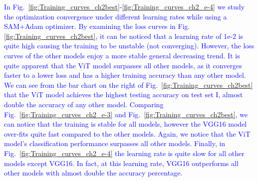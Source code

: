 \documentclass[a4paper,11pt]{article}
\begin{document}
\textcolor{blue}{In Fig.~\ref{fig:Training_curves_ch2best}-\ref{fig:Training_curves_ch2_e-4} we study the optimization convergence under different learning rates while using a SAM+Adam optimizer. By examining the loss curves in Fig.\ref{fig:Training_curves_ch2best}, it can be noticed that a learning rate of 1e-2 is quite high causing the training to be unstable (not converging). However, the loss curves of the other models enjoy a more stable general decreasing trend. It is quite apparent that the ViT model surpasses all other models, as it converges faster to a lower loss and has a higher training accuracy than any other model. We can see from the bar chart on the right of Fig.~\ref{fig:Training_curves_ch2best} that the ViT model achieves the highest testing accuracy on test set I, almost double the accuracy of any other model. Comparing Fig.~\ref{fig:Training_curves_ch2_e-3} and Fig.~\ref{fig:Training_curves_ch2best}, we can notice that the training is stable for all models, however the VGG16 model over-fits quite fast compared to the other models. Again, we notice that the ViT model's classification performance surpasses all other models. Finally, in Fig.~\ref{fig:Training_curves_ch2_e-4} the learning rate is quite slow for all other models except VGG16. In fact, at this learning rate, VGG16 outperforms all other models with almost double the accuracy percentage. }
\end{document}
